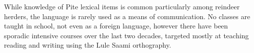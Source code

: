 \documentclass[a4paper,12pt]{article}
\begin{document}
While knowledge of Pite lexical items is common particularly among reindeer herders, the language is rarely used as a means of communication. No classes are taught in school, not even as a foreign language, however there have been sporadic intensive courses over the last two decades, targeted mostly at teaching reading and writing using the Lule Saami orthography.

\end{document}
